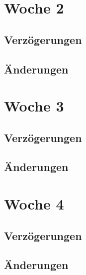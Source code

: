 \section{Woche 2}
\subsection{Verzögerungen}
\subsection{Änderungen}
\section{Woche 3}
\subsection{Verzögerungen}
\subsection{Änderungen}
\section{Woche 4}
\subsection{Verzögerungen}
\subsection{Änderungen}